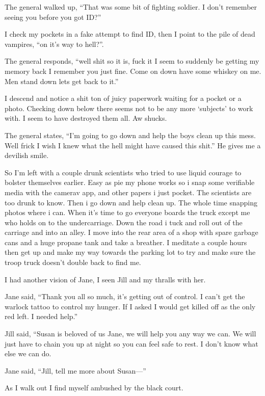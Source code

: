 The general walked up, ``That was some bit of fighting soldier. I don't remember seeing you before you got ID?'' 

I check my pockets in a fake attempt to find ID, then I point to the pile of dead vampires, ``on it's way to hell?''. 

The general responds, ``well shit so it is, fuck it I seem to suddenly be getting my memory back I remember you just fine. Come on down have some whiskey on me. Men stand down lets get back to it.'' 

I descend and notice a shit ton of juicy paperwork waiting for a pocket or a photo. Checking down below there seems not to be any more `subjects' to work with. I seem to have destroyed them all. Aw shucks. 

The general states, ``I'm going to go down and help the boys clean up this mess. Well frick I wish I knew what the hell might have caused this shit.'' He gives me a devilish smile.

So I'm left with a couple drunk scientists who tried to use liquid courage to bolster themselves earlier. Easy as pie my phone works so i snap some verifiable media with the camerav app, and other papers i just pocket. The scientists are too drunk to know. Then i go down and help clean up. The whole time snapping photos where i can. When it's time to go everyone boards the truck except me who holds on to the undercarriage. Down the road i tuck and roll out of the carriage and into an alley. I move into the rear area of a shop with spare garbage cans and a huge propane tank and take a breather. I meditate a couple hours then get up and make my way towards the parking lot to try and make sure the troop truck doesn't double back to find me.

I had another vision of Jane, I seen Jill and my thralls with her.

Jane said, ``Thank you all so much, it's getting out of control. I can't get the warlock tattoo to control my hunger. If I asked I would get killed off as the only red left. I needed help.''

Jill said, ``Susan is beloved of us Jane, we will help you any way we can. We will just have to chain you up at night so you can feel safe to rest. I don't know what else we can do.

Jane said, ``Jill, tell me more about Susan---''

As I walk out I find myself ambushed by the black court.

